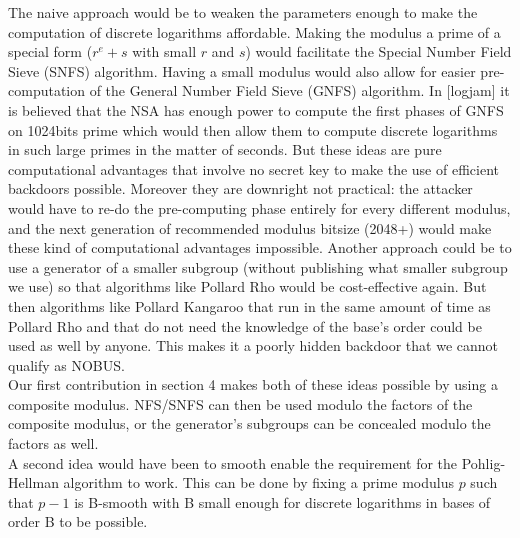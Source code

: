 \documentclass[a4paper,11pt,twocolumn]{article}
\begin{document}
The naive approach would be to weaken the parameters enough to make the computation of discrete logarithms affordable. Making the modulus a prime of a special form ($r^e + s$ with small $r$ and $s$) would facilitate the Special Number Field Sieve (SNFS) algorithm. Having a small modulus would also allow for easier pre-computation of the General Number Field Sieve (GNFS) algorithm. In [logjam] it is believed that the NSA has enough power to compute the first phases of GNFS on 1024bits prime which would then allow them to compute discrete logarithms in such large primes in the matter of seconds. But these ideas are pure computational advantages that involve no secret key to make the use of efficient backdoors possible. Moreover they are downright not practical: the attacker would have to re-do the pre-computing phase entirely for every different modulus, and the next generation of recommended modulus bitsize (2048+) would make these kind of computational advantages impossible. Another approach could be to use a generator of a smaller subgroup (without publishing what smaller subgroup we use) so that algorithms like Pollard Rho would be cost-effective again. But then algorithms like Pollard Kangaroo that run in the same amount of time as Pollard Rho and that do not need the knowledge of the base's order could be used as well by anyone. This makes it a poorly hidden backdoor that we cannot qualify as NOBUS.\\

Our first contribution in section 4 makes both of these ideas possible by using a composite modulus. NFS/SNFS can then be used modulo the factors of the composite modulus, or the generator's subgroups can be concealed modulo the factors as well.\\

A second idea would have been to smooth enable the requirement for the Pohlig-Hellman algorithm to work. This can be done by fixing a prime modulus $p$ such that $p-1$ is B-smooth  with B small enough for discrete logarithms in bases of order B to be possible.\\

\begin{center}
\end{center}
\end{document}
